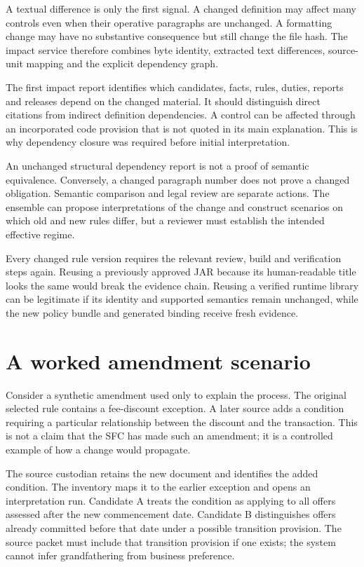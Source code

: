 \documentclass[12pt,a4paper,oneside,openany]{book}
\begin{document}
A textual difference is only the first signal. A changed definition may affect
many controls even when their operative paragraphs are unchanged. A formatting
change may have no substantive consequence but still change the file hash. The
impact service therefore combines byte identity, extracted text differences,
source-unit mapping and the explicit dependency graph.

The first impact report identifies which candidates, facts, rules, duties,
reports and releases depend on the changed material. It should distinguish direct
citations from indirect definition dependencies. A control can be affected through
an incorporated code provision that is not quoted in its main explanation. This
is why dependency closure was required before initial interpretation.

An unchanged structural dependency report is not a proof of semantic equivalence.
Conversely, a changed paragraph number does not prove a changed obligation.
Semantic comparison and legal review are separate actions. The ensemble can
propose interpretations of the change and construct scenarios on which old and
new rules differ, but a reviewer must establish the intended effective regime.

Every changed rule version requires the relevant review, build and verification
steps again. Reusing a previously approved JAR because its human-readable title
looks the same would break the evidence chain. Reusing a verified runtime library
can be legitimate if its identity and supported semantics remain unchanged, while
the new policy bundle and generated binding receive fresh evidence.

\section{A worked amendment scenario}

Consider a synthetic amendment used only to explain the process. The original
selected rule contains a fee-discount exception. A later source adds a condition
requiring a particular relationship between the discount and the transaction.
This is not a claim that the SFC has made such an amendment; it is a controlled
example of how a change would propagate.

The source custodian retains the new document and identifies the added condition.
The inventory maps it to the earlier exception and opens an interpretation run.
Candidate A treats the condition as applying to all offers assessed after the
new commencement date. Candidate B distinguishes offers already committed before
that date under a possible transition provision. The source packet must include
that transition provision if one exists; the system cannot infer grandfathering
from business preference.
\end{document}
